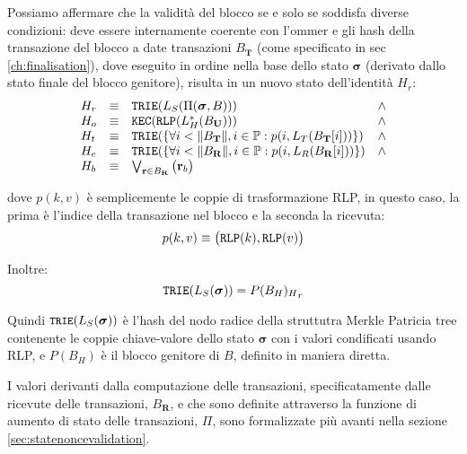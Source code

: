 \documentclass[9pt,oneside]{amsart}
\begin{document}
\begin{multicols}{2}
Possiamo affermare che la validità del blocco se e solo se soddisfa diverse condizioni: deve essere internamente coerente con l'ommer e gli hash della transazione del blocco a date transazioni $B_\mathbf{T}$ (come specificato in sec \ref{ch:finalisation}), dove eseguito in ordine nella base dello stato $\boldsymbol{\sigma}$ (derivato dallo stato finale del blocco genitore), risulta in un nuovo stato dell'identità $H_r$:
\begin{equation}
\begin{array}[t]{lclc}
H_r &\equiv& \mathtt{\small TRIE}(L_S(\Pi(\boldsymbol{\sigma}, B))) & \wedge \\
H_o &\equiv& \mathtt{\small KEC}(\mathtt{\small RLP}(L_H^*(B_\mathbf{U}))) & \wedge \\
H_t &\equiv& \mathtt{\small TRIE}(\{\forall i < \lVert B_\mathbf{T} \rVert, i \in \mathbb{P}: p(i, L_T(B_\mathbf{T}[i]))\}) & \wedge \\
H_e &\equiv& \mathtt{\small TRIE}(\{\forall i < \lVert B_\mathbf{R} \rVert, i \in \mathbb{P}: p(i, L_R(B_\mathbf{R}[i]))\}) & \wedge \\
H_b &\equiv& \bigvee_{\mathbf{r} \in B_\mathbf{R}} \big( \mathbf{r}_b \big)
\end{array}
\end{equation}

dove $p(k, v)$ è semplicemente le coppie di trasformazione RLP, in questo caso, la prima è l'indice della transazione nel blocco e la seconda la ricevuta:
\begin{equation}
p(k, v) \equiv \big( \mathtt{\small RLP}(k), \mathtt{\small RLP}(v) \big)
\end{equation}

Inoltre:
\begin{equation}
\mathtt{\small TRIE}(L_S(\boldsymbol{\sigma})) = {P(B_H)_H}_r
\end{equation}

Quindi $\texttt{\small TRIE}(L_S(\boldsymbol{\sigma}))$ è l'hash del nodo radice della struttutra Merkle Patricia tree contenente le coppie chiave-valore dello stato $\boldsymbol{\sigma}$ con i valori condificati usando RLP, e $P(B_H)$ è il blocco genitore di $B$, definito in maniera diretta.

I valori derivanti dalla computazione delle transazioni, specificatamente dalle ricevute delle transazioni, $B_\mathbf{R}$, e che sono definite attraverso la funzione di aumento di stato delle transazioni, $\Pi$, sono formalizzate più avanti nella sezione \ref{sec:statenoncevalidation}.


\end{multicols}
\end{document}
